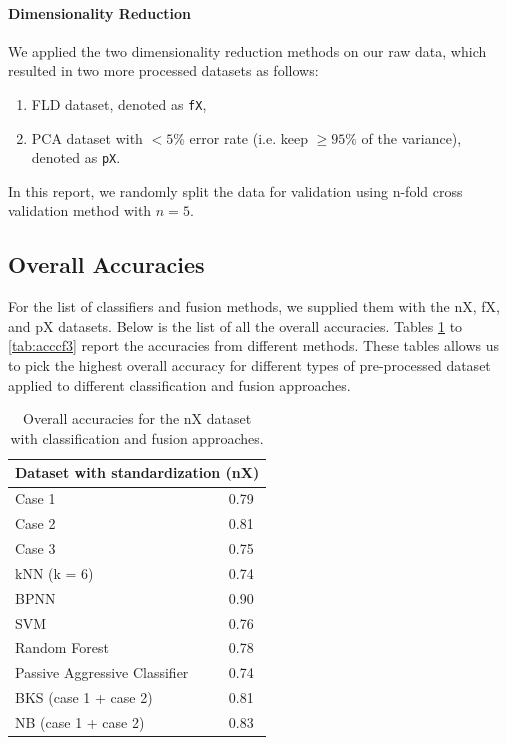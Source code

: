 \documentclass{article}
\begin{document}
\paragraph{Dimensionality Reduction}

We applied the two dimensionality reduction methods on our raw data, which resulted in two more processed datasets as follows:
\begin{enumerate}
    \item FLD dataset, denoted as \texttt{fX},
    \item PCA dataset with $< 5\%$ error rate (i.e. keep $\geq 95\%$ of the variance), denoted as \texttt{pX}.
\end{enumerate}

In this report, we randomly split the data for validation using n-fold cross validation method with $n=5$.

\subsection{Overall Accuracies}

For the list of classifiers and fusion methods, we supplied them with the nX, fX, and pX datasets. Below is the list of all the overall accuracies. Tables \ref{tab:acccf1} to \ref{tab:acccf3} report the accuracies from different methods. These tables allows us to pick the highest overall accuracy for different types of pre-processed dataset applied to different classification and fusion approaches.

\begin{table}[h]
\centering
\begin{tabular}{@{}ll@{}}
\toprule
\multicolumn{2}{c}{Dataset with standardization (nX)}        \\ \midrule
Case 1                          & 0.79                  
\\
Case 2                          & 0.81                  \\
Case 3                          & 0.75                 \\
kNN (k = 6)                     & 0.74                  \\
BPNN                            & 0.90                  \\
SVM                             & 0.76                  \\
Random Forest                   & 0.78                 \\
Passive Aggressive Classifier   & 0.74                  \\
BKS (case 1 + case 2)           & 0.81                  \\
NB (case 1 + case 2)            & 0.83                  \\ \bottomrule
\end{tabular}
\caption{Overall accuracies for the nX dataset with classification and fusion approaches.}
\label{tab:acccf1}
\end{table}
\end{document}
